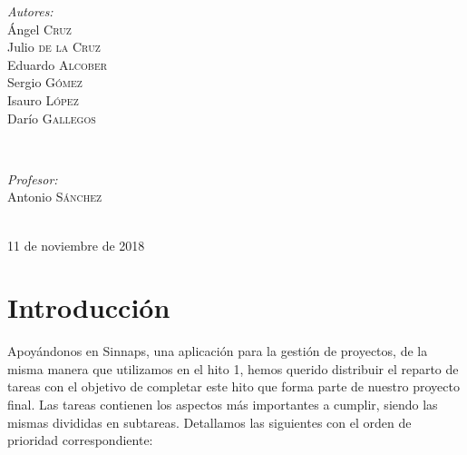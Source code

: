 \documentclass[12pt]{article}
\begin{document}
\begin{titlepage}
\begin{minipage}{0.4\textwidth}
\begin{flushleft} \large
\emph{Autores:}\\
Ángel \textsc{Cruz} \\ %
Julio \textsc{de la Cruz} \\
Eduardo \textsc{Alcober}\\
Sergio \textsc{Gómez}\\
Isauro \textsc{López}\\
Darío \textsc{Gallegos}
\end{flushleft}
\end{minipage}
~
\begin{minipage}{0.4\textwidth}
\begin{flushright} \large
\emph{Profesor:} \\
Antonio \textsc{Sánchez} %
\end{flushright}
\end{minipage}\\[0.85cm]


{\large 11 de noviembre de 2018}\\[0.5cm] %



\vfill %

\end{titlepage}



\tableofcontents %
\newpage


\section{Introducción}
Apoyándonos en Sinnaps, una aplicación para la gestión de proyectos, de la misma manera que utilizamos en el hito 1, hemos querido distribuir el reparto de tareas con el objetivo de completar este hito que forma parte de nuestro proyecto final. Las tareas contienen los aspectos más importantes a cumplir, siendo las mismas divididas en subtareas. Detallamos las siguientes con el orden de prioridad correspondiente:
\end{document}
